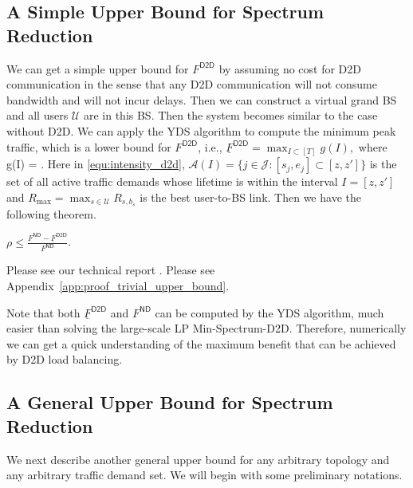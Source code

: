 \subsection{A Simple Upper Bound for Spectrum Reduction}
We can get a simple upper bound for $F^{\textsf{D2D}}$ by assuming no cost for D2D communication in the sense
that any D2D communication will not consume bandwidth and will not incur delays. Then we can
construct a virtual grand BS and all users $\mathcal{U}$ are in this BS. Then the system becomes similar
to the case without D2D. We can apply the YDS algorithm
to compute the minimum peak traffic, which is a lower bound
for $F^{\textsf{D2D}}$, i.e.,
$
\underline{F}^{\textsf{D2D}}=  \max_{I \subset [T]} g(I),
$
where
\be
g(I) = .
\label{equ:intensity_d2d}
\ee
Here in \eqref{equ:intensity_d2d},
$
\mathcal{A}(I) = \{j \in \mathcal{J}: [s_j, e_j] \subset [z,z']\}
$
is the set of all active traffic demands whose lifetime is within the interval $I=[z,z']$
and $R_{\max} = \max_{s \in \mathcal{U}} R_{s,b_s}$ is the best user-to-BS link. Then we have the following theorem.


\begin{theorem}
$\rho \le \frac{F^{\textsf{ND}}-\underline{F}^{\textsf{D2D}}}{F^{\textsf{ND}}}$.
\label{the:trivial_upper_bound}
\end{theorem}
\begin{IEEEproof}
\ifx \ISTR \undefined
Please see our technical report \cite{TR}.
\else
Please see Appendix~\ref{app:proof_trivial_upper_bound}.
\fi
\end{IEEEproof}

Note that both $\underline{F}^{\textsf{D2D}}$ and $F^{\textsf{ND}}$ can be computed by the YDS algorithm, much
easier than solving the large-scale LP \textsf{Min-Spectrum-D2D}. Therefore, numerically we can get
a quick understanding of the maximum benefit that can be achieved by D2D load balancing.

\subsection{A General Upper Bound for Spectrum Reduction} \label{sec:a_general_upper_bound}
We next describe another general upper
bound for any arbitrary topology and any arbitrary traffic demand set. We will begin with
some preliminary notations.

